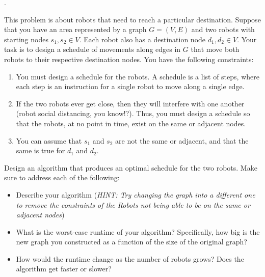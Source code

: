 \documentclass[12pt]{article}
\newcounter{quesnum}
\newcommand{\question}[2][??]{
\begin{list}{\labelitemi}{\leftmargin=2em}
\item [\arabic{quesnum}.] {#2}
\end{list}
\addtocounter{quesnum}{1}
}
\begin{document}
\question[1]{
This problem is about robots that need to reach a particular destination. Suppose that you have an area represented by a graph $G = (V,E)$ and two robots with starting nodes $s_1, s_2 \in V$. Each robot also has a destination node $d_1,d_2 \in V$. Your task is to design a schedule of movements along edges in $G$ that move both robots to their respective destination nodes. You have the following constraints:

\begin{enumerate}
\item You must design a schedule for the robots. A schedule is a list of steps, where each step is an instruction for a single robot to move along a single edge.
\item If the two robots ever get close, then they will interfere with one another (robot social distancing, you know!?). Thus, you must design a schedule so that the robots, at no point in time, exist on the same or adjacent nodes.
\item You can assume that $s_1$ and $s_2$ are not the same or adjacent, and that the same is true for $d_1$ and $d_2$.
\end{enumerate}

Design an algorithm that produces an optimal schedule for the two robots. Make sure to address each of the following:

\begin{itemize}
	\item Describe your algorithm (\emph{HINT: Try changing the graph into a different one to remove the constraints of the Robots not being able to be on the same or adjacent nodes})
	\item What is the worst-case runtime of your algorithm? Specifically, how big is the new graph you constructed as a function of the size of the original graph?
	\item How would the runtime change as the number of robots grows? Does the algorithm get faster or slower?

\end{itemize}
}













\end{document}
